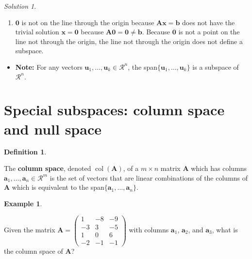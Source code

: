 \documentclass[
]{book}
\providecommand{\tightlist}{%
  \setlength{\itemsep}{0pt}\setlength{\parskip}{0pt}}
\theoremstyle{definition}
\newtheorem{definition}{Definition}[chapter]
\theoremstyle{definition}
\newtheorem{example}{Example}[chapter]
\theoremstyle{definition}
\theoremstyle{remark}
\newtheorem*{solution}{Solution}
\begin{document}
\begin{solution}
\begin{enumerate}
\def\labelenumi{\arabic{enumi})}
\tightlist
\item
  \(\mathbf{0}\) is not on the line through the origin because \(\mathbf{A} \mathbf{x} = \mathbf{b}\) does not have the trivial solution \(\mathbf{x} = \mathbf{0}\) because \(\mathbf{A} \mathbf{0} = \mathbf{0} \neq \mathbf{b}\). Because \(\mathbf{0}\) is not a point on the line not through the origin, the line not through the origin does not define a subspace.
\end{enumerate}

\end{solution}

\begin{itemize}
\tightlist
\item
  \textbf{Note:} For any vectors \(\mathbf{u}_1, \ldots, \mathbf{u}_k \in \mathcal{R}^n\), the span\(\{\mathbf{u}_1, \ldots, \mathbf{u}_k\}\) is a subspace of \(\mathcal{R}^n\).
\end{itemize}

\hypertarget{special-subspaces-column-space-and-null-space}{%
\section{Special subspaces: column space and null space}\label{special-subspaces-column-space-and-null-space}}

\begin{definition}
\protect\hypertarget{def:column-space}{}\label{def:column-space}

The \textbf{column space}, denoted \(\operatorname{col}(\mathbf{A})\), of a \(m \times n\) matrix \(\mathbf{A}\) which has columns \(\mathbf{a}_1, \ldots, \mathbf{a}_n \in \mathcal{R}^m\) is the set of vectors that are linear combinations of the columns of \(\mathbf{A}\) which is equivalent to the span\(\{\mathbf{a}_1, \ldots, \mathbf{a}_n\}\).

\end{definition}

\begin{example}
\protect\hypertarget{exm:unlabeled-div-83}{}\label{exm:unlabeled-div-83}

Given the matrix \(\mathbf{A} = \begin{pmatrix} 1 & -8 & -9 \\ -3 & 3 & -5 \\ 1 & 0 & 6 \\ -2 & -1 & -1 \end{pmatrix}\) with columns \(\mathbf{a}_1\), \(\mathbf{a}_2\), and \(\mathbf{a}_3\), what is the column space of \(\mathbf{A}\)?

\end{example}
\end{document}
